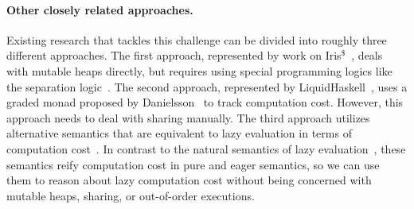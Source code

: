 \paragraph{Other closely related approaches.}
Existing research that tackles this challenge can be divided into roughly three
different approaches. The first approach, represented by work on
Iris$^{\$}$~\cite{iris-credit,iris-thunk}, deals with mutable heaps directly,
but requires using special programming logics like the separation
logic~\cite{separation-logic}. The second approach, represented by
LiquidHaskell~\cite{liquidate,liquid-okasaki}, uses a graded monad proposed by
Danielsson~\cite{danielsson-08} to track computation cost. However, this
approach needs to deal with sharing manually. The third approach utilizes
alternative semantics that are equivalent to lazy evaluation in terms of
computation cost~\cite{bjerner1989,clairvoyant,forking-paths,demand-semantics}.
In contrast to the natural semantics of lazy evaluation~\cite{launchbury1993},
these semantics reify computation cost in pure and eager semantics, so we can
use them to reason about lazy computation cost without being concerned with
mutable heaps, sharing, or out-of-order executions.

\fi



